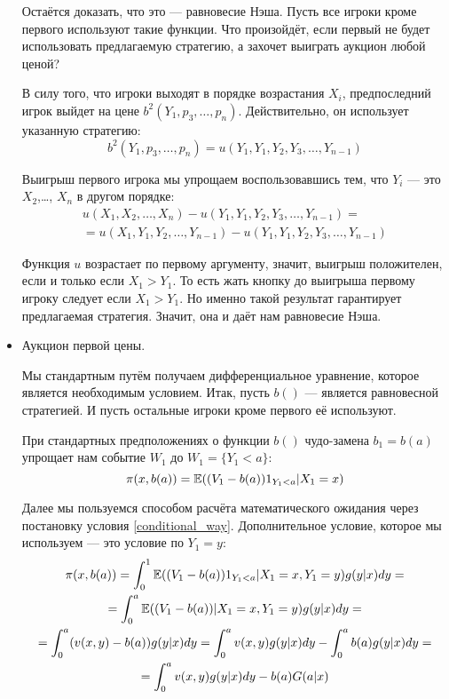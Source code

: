 \begin{itemize}
Остаётся доказать, что это — равновесие Нэша. Пусть все игроки кроме первого используют такие функции. Что произойдёт, если первый не будет использовать предлагаемую стратегию, а захочет выиграть аукцион любой ценой?

В силу того, что игроки выходят в порядке возрастания $ X_{i} $, предпоследний игрок выйдет на цене $ b^{2}(Y_{1},p_{3},\ldots,p_{n}) $. Действительно, он использует указанную стратегию:
\begin{equation}
b^{2}(Y_{1},p_{3},\ldots,p_{n}) =u(Y_{1},Y_{1},Y_{2},Y_{3},\ldots,Y_{n-1})
\end{equation}

Выигрыш первого игрока мы упрощаем воспользовавшись тем, что $ Y_{i} $ — это $ X_{2} $,\ldots, $ X_{n} $ в другом порядке:
\begin{multline}
u(X_{1},X_{2},\ldots,X_{n})-u(Y_{1},Y_{1},Y_{2},Y_{3},\ldots,Y_{n-1})=\\
=u(X_{1},Y_{1},Y_{2},\ldots,Y_{n-1})-u(Y_{1},Y_{1},Y_{2},Y_{3},\ldots,Y_{n-1})
\end{multline}

Функция $ u $ возрастает по первому аргументу, значит, выигрыш положителен, если и только если $ X_{1}>Y_{1} $. То есть жать кнопку до выигрыша первому игроку следует если $ X_{1}>Y_{1} $. Но именно такой результат гарантирует предлагаемая стратегия. Значит, она и даёт нам равновесие Нэша.


\item Аукцион первой цены.

Мы стандартным путём получаем дифференциальное уравнение, которое является необходимым условием. Итак, пусть $ b() $ — является равновесной стратегией. И пусть остальные игроки кроме первого её используют.

При стандартных предположениях о функции $ b() $ чудо-замена $ b_{1}=b(a) $ упрощает нам событие $ W_{1} $ до $ W_{1}=\{Y_{1}<a\} $:
\begin{equation}
\pi(x,b(a))=\operatorname{\mathbb{E}}((V_{1}-b(a))1_{Y_{1}<a}|X_{1}=x)
\end{equation}

Далее мы пользуемся способом расчёта математического ожидания через постановку условия \ref{conditional_way}. Дополнительное условие, которое мы используем — это условие по $ Y_{1}=y $:
\begin{multline}
\pi(x,b(a))=\int_{0}^{1}\operatorname{\mathbb{E}}((V_{1}-b(a))1_{Y_{1}<a}|X_{1}=x,Y_{1}=y)g(y|x)dy=\\
=\int_{0}^{a}\operatorname{\mathbb{E}}((V_{1}-b(a))|X_{1}=x,Y_{1}=y)g(y|x)dy=\\
=\int_{0}^{a}(v(x,y)-b(a))g(y|x)dy=\int_{0}^{a}v(x,y)g(y|x)dy-\int_{0}^{a}b(a)g(y|x)dy=\\
=\int_{0}^{a}v(x,y)g(y|x)dy-b(a)G(a|x)
\end{multline}


\end{itemize}
